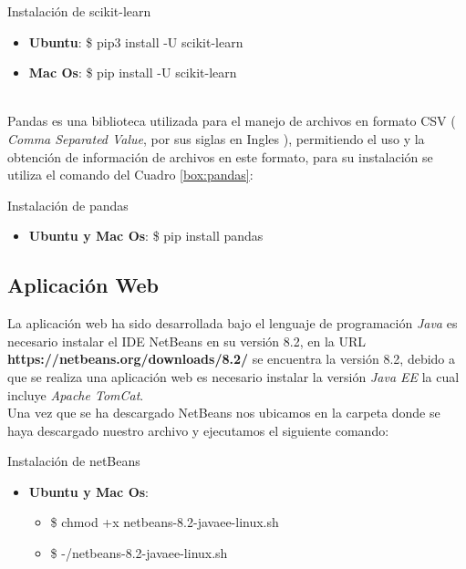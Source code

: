 \begin{mygraybox}[label={box:scikit}]{Instalación de scikit-learn} 
\begin{itemize}
	\item \textbf{Ubuntu}: \$ pip3 install -U scikit-learn

	\item \textbf{Mac Os}: \$ pip install -U scikit-learn
\end{itemize}
\end{mygraybox}
\ \\
Pandas es una biblioteca utilizada para el manejo de archivos en formato CSV ( \textit{Comma Separated Value}, por sus siglas en Ingles ), permitiendo el uso y la obtención de información de archivos en este formato, para su instalación se utiliza el comando del Cuadro \ref{box:pandas}:\\
\begin{mygraybox}[label={box:pandas}]{Instalación de pandas} 
\begin{itemize}
	\item \textbf{Ubuntu y Mac Os}: \$ pip install pandas
\end{itemize}	
\end{mygraybox}

\subsection{Aplicación Web}
La aplicación web ha sido desarrollada bajo el lenguaje de programación \textit{Java} es necesario instalar el IDE NetBeans en su versión 8.2, en la URL \textcolor{myDarkBlue}{\textbf{https://netbeans.org/downloads/8.2/}} se encuentra la versión 8.2, debido a que se realiza una aplicación web es necesario instalar la versión \textit{Java EE} la cual incluye \textit{Apache TomCat}.\\

Una vez que se ha descargado NetBeans nos ubicamos en la carpeta donde se haya descargado nuestro archivo y ejecutamos el siguiente comando:\\

\begin{mygraybox}[label={box:netbeans}]{Instalación de netBeans} 
\begin{itemize}
	\item \textbf{Ubuntu y Mac Os}:
	\begin{itemize}
		\item \$ chmod +x netbeans-8.2-javaee-linux.sh
		\item \$ -/netbeans-8.2-javaee-linux.sh 
	\end{itemize}	
\end{itemize}
\end{mygraybox}
